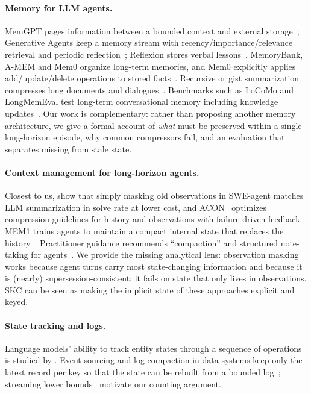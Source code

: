 \paragraph{Memory for LLM agents.} MemGPT pages information between a bounded
context and external storage~\citep{packer2023memgpt}; Generative Agents keep a
memory stream with recency/importance/relevance retrieval and periodic
reflection~\citep{park2023generative}; Reflexion stores verbal
lessons~\citep{shinn2023reflexion}. MemoryBank, A-MEM and Mem0 organize long-term
memories, and Mem0 explicitly applies add/update/delete operations to stored
facts~\citep{zhong2024memorybank,xu2025amem,chhikara2025mem0}. Recursive or
gist summarization compresses long documents and
dialogues~\citep{wang2023recursively,lee2024readagent,chen2023memwalker}.
Benchmarks such as LoCoMo and LongMemEval test long-term conversational memory
including knowledge updates~\citep{maharana2024locomo,wu2025longmemeval}. Our
work is complementary: rather than proposing another memory architecture, we
give a formal account of \emph{what} must be preserved within a single
long-horizon episode, why common compressors fail, and an evaluation that
separates missing from stale state.

\paragraph{Context management for long-horizon agents.} Closest to us,
\citet{lindenbauer2025complexity} show that simply masking old observations in
SWE-agent matches LLM summarization in solve rate at lower cost, and
ACON~\citep{kang2025acon} optimizes compression guidelines for history and
observations with failure-driven feedback. MEM1 trains agents to maintain a
compact internal state that replaces the history~\citep{zhou2025mem1}.
Practitioner guidance recommends ``compaction'' and structured note-taking for
agents~\citep{anthropic2025context}. We provide the missing analytical lens:
observation masking works because agent turns carry most state-changing
information and because it is (nearly) supersession-consistent; it fails on
state that only lives in observations. SKC can be seen as making the implicit
state of these approaches explicit and keyed.

\paragraph{State tracking and logs.} Language models' ability to track entity
states through a sequence of operations is studied by
\citet{kim2023entity}. Event sourcing and log compaction in data systems keep
only the latest record per key so that the state can be rebuilt from a bounded
log~\citep{kreps2011kafka,kleppmann2017ddia}; streaming lower
bounds~\citep{alon1999space} motivate our counting argument.

